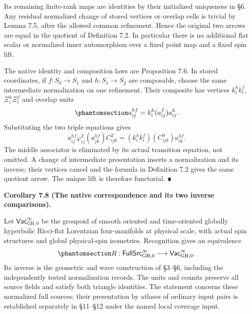 \documentclass[
  english,
  11pt,
  reqno]{amsart}
\makeatletter
\newcommand{\pandocstatementheading}[1]{%
  \par\addpenalty{\@beginparpenalty}%
  \addvspace{.5\baselineskip plus .2\baselineskip minus .2\baselineskip}%
  {\normalfont\bfseries #1\par}%
  \nobreak\@afterindenttrue\@afterheading
}
\makeatother
\begin{document}
Its remaining finite-rank maps are identities by their initialized
uniqueness in §6. Any residual normalized change of stored vertices or
overlap cells is trivial by Lemma 7.5, after the allowed common
refinement. Hence the original two arrows are equal in the quotient of
Definition 7.2. In particular there is no additional flat scalar or
normalized inner automorphism over a fixed point map and a fixed spin
lift.

The native identity and composition laws are Proposition 7.6. In stored
coordinates, if \(f:S_0\to S_1\) and \(h:S_1\to S_2\) are composable,
choose the same intermediate normalization on one refinement. Their
composite has vertices \(k_i^h k_i^f\), \(\Xi_i^h\Xi_i^f\) and overlap
units
\begin{equation}\protect\phantomsection\label{eq:global-stored-arrow-composition}{
a_{ij}^{hf}=k_i^h(a_{ij}^f)a_{ij}^h.
}\end{equation} Substituting the two triple equations gives \[
a_{ij}^{hf}\varphi_{ij}^2(a_{jk}^{hf})C_{ijk}^2
 =(k_i^h k_i^f)(C_{ijk}^0)a_{ik}^{hf}.
\] The middle associator is eliminated by its actual transition
equation, not omitted. A change of intermediate presentation inserts a
normalization and its inverse; their vertices cancel and the formula in
Definition 7.2 gives the same quotient arrow. The unique lift is
therefore functorial. ∎

\pandocstatementheading{\protect{}\label{cor:global-full-source-equivalence}Corollary 7.8 (The native correspondence and its two inverse
comparisons).}

Let \(\mathsf{Vac}^{\infty}_{\mathrm{GH},0}\) be the groupoid of smooth
oriented and time-oriented globally hyperbolic Ricci-flat Lorentzian
four-manifolds at physical scale, with actual spin structures and global
physical-spin isometries. Recognition gives an equivalence
\begin{equation}\protect\phantomsection\label{eq:global-native-source-equivalence}{
R:\mathsf{FullSrc}^{\infty}_{\mathrm{GH},0}
\longrightarrow\mathsf{Vac}^{\infty}_{\mathrm{GH},0}.
}\end{equation} Its inverse is the geometric and wave construction of
§3--§6, including the independently tested normalization records. The
units and counits preserve all source fields and satisfy both triangle
identities. The statement concerns these normalized full sources; their
presentation by atlases of ordinary input pairs is established
separately in §11--§12 under the named local coverage input.
\end{document}

